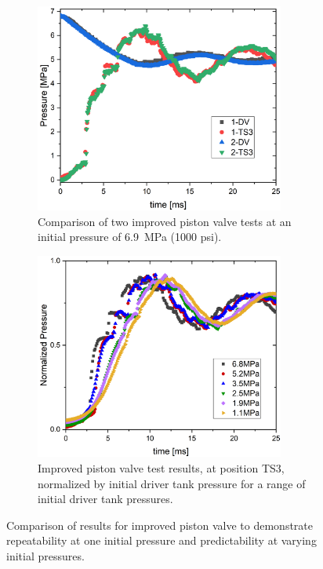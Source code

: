 \begin{figure}[bt]
    \centering
    \begin{subfigure}[t]{0.45\textwidth}
        \centering
        \includegraphics[width=0.9\textwidth]{results/plots/1000psi_FFKM_Piston_2.png}
        \caption{Comparison of two improved piston valve tests at an initial pressure of \SI{6.9}{\mega\pascal} (1000 psi).}
        \label{fig:new piston 2 test}
    \end{subfigure}
    \hfill
    \begin{subfigure}[t]{0.45\textwidth}
        \centering
        \includegraphics[width=0.9\textwidth]{results/plots/norm_FFKM.png}
        \caption{Improved piston valve test results, at position TS3, normalized by initial driver tank pressure for a range of initial driver tank pressures.}
        \label{fig:new norm}
    \end{subfigure}
    \caption{Comparison of results for improved piston valve to demonstrate repeatability at one initial pressure and predictability at varying initial pressures.}
    \label{fig:new piston repeatability}
\end{figure}

